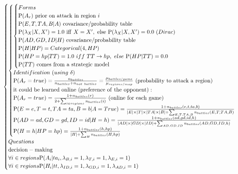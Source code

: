 \begin{footnotesize}
\begin{eqnarray*}
\begin{cases}
\begin{cases}
\begin{cases}
        Forms\\

\PP(A_r)\ \mathrm{prior\ on\ attack\ in\ region}\ i\\
\PP(E,T,TA,B|A)\ \mathrm{covariance/probability\ table}\\ 
\PP(\lambda_{X}|X,X') = 1.0\ \mathrm{iff}\ X=X',\ \mathrm{else}\ \PP(\lambda_{X}|X,X') = 0.0\ (Dirac)\\ 
\PP(AD,GD,ID|H)\ \mathrm{covariance/probability\ table}\\
\PP(H|HP) = Categorical(4,HP)\\
\PP(HP=hp|TT) = 1.0\ iff\ TT\rightarrow hp,\ else\ \PP(HP|TT)=0.0\\
\PP(TT)\ \mathrm{comes\ from\ a\ strategic\ model}\\
        \end{cases}\\

    Identification\ (using\ \delta)\\
\PP(A_r=true)= \frac{n_{battles}}{n_{battles}+n_{not\ battles}} = \frac{\mu_{battles/game}}{\mu_{regions/map}}\ \mathrm{(probability\ to\ attack\ a\ region)}\\
\mathrm{it\ could\ be\ learned\ online\ (preference\ of\ the\ opponent):}\\
\PP(A_r=true) = \frac{1 + n_{battles}(r)}{2 + \sum_{i \in regions}n_{battles}(i)}\ \mathrm{(online\ for\ each\ game)}\\
\PP(E=e,T=t,TA=ta,B=b|A=True) = \frac{1+n_{battles}(e,t,ta,b)}{\abs{E} \times \abs{T} \times \abs{TA} \times \abs{B} + \sum_{E,T,TA,B} n_{battles}(E,T,TA,B)} \\
\PP(AD=ad,GD=gd,ID=id|H=h) = \frac{1+n_{battles}(ad,gd,id,h)}{\abs{AD} \times \abs{GD} \times \abs{ID} + \sum_{AD,GD,ID} n_{battles}(AD,GD,ID,h)} \\
\PP(H=h|HP=hp) = \frac{1 + n_{battles}(h,hp)}{\abs{H} + \sum_{H} n_{battles}(H,hp)}\\
    \end{cases}\\
Questions\\
\mathrm{decision-making}\\
\forall i \in regions \PP(A_i|ta_i,\lambda_{B,i}=1,\lambda_{T,i}=1,\lambda_{E,i}=1)\\
\forall i \in regions \PP(H_i|tt,\lambda_{ID,i}=1,\lambda_{GD,i}=1,\lambda_{AD,i}=1) \\
\end{cases}
\label{bp:BayesianTacticianFull}
\end{eqnarray*}
\end{footnotesize}




